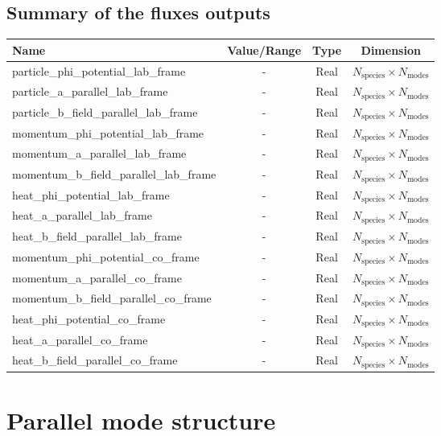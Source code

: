 \documentclass[a4paper]{report}
\begin{document}
\subsection{Summary of the fluxes outputs}
\begin{tabularx}{\textwidth}{|L|S|S|S|}
\hline
Name & Value/Range & Type & Dimension \\
\hline
particle\_phi\_potential\_lab\_frame & - & Real & $N_\textrm{species}\times N_\textrm{modes}$\\ 
particle\_a\_parallel\_lab\_frame & - & Real & $N_\textrm{species}\times N_\textrm{modes}$\\ 
particle\_b\_field\_parallel\_lab\_frame & - & Real & $N_\textrm{species}\times N_\textrm{modes}$\\ 
momentum\_phi\_potential\_lab\_frame & - & Real & $N_\textrm{species}\times N_\textrm{modes}$\\ 
momentum\_a\_parallel\_lab\_frame & - & Real & $N_\textrm{species}\times N_\textrm{modes}$\\ 
momentum\_b\_field\_parallel\_lab\_frame & - & Real & $N_\textrm{species}\times N_\textrm{modes}$\\ 
heat\_phi\_potential\_lab\_frame & - & Real & $N_\textrm{species}\times N_\textrm{modes}$\\ 
heat\_a\_parallel\_lab\_frame & - & Real & $N_\textrm{species}\times N_\textrm{modes}$\\ 
heat\_b\_field\_parallel\_lab\_frame & - & Real & $N_\textrm{species}\times N_\textrm{modes}$\\ 
momentum\_phi\_potential\_co\_frame & - & Real & $N_\textrm{species}\times N_\textrm{modes}$\\ 
momentum\_a\_parallel\_co\_frame & - & Real & $N_\textrm{species}\times N_\textrm{modes}$\\ 
momentum\_b\_field\_parallel\_co\_frame & - & Real & $N_\textrm{species}\times N_\textrm{modes}$\\ 
heat\_phi\_potential\_co\_frame & - & Real & $N_\textrm{species}\times N_\textrm{modes}$\\ 
heat\_a\_parallel\_co\_frame & - & Real & $N_\textrm{species}\times N_\textrm{modes}$\\ 
heat\_b\_field\_parallel\_co\_frame & - & Real & $N_\textrm{species}\times N_\textrm{modes}$\\ 
\hline
\end{tabularx}

\section{Parallel mode structure}
\end{document}
